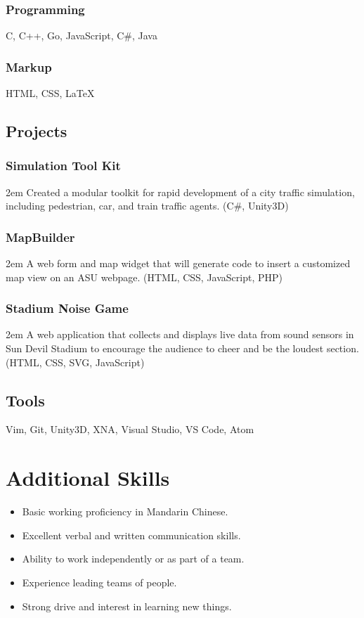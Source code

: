 \documentclass[letterpaper, 10pt]{article}
\begin{document}
\subsubsection{Programming}

C, C++, Go, JavaScript, C\#, Java

\subsubsection{Markup}

HTML, CSS, {\LaTeX}

\subsection{Projects}

\subsubsection{Simulation Tool Kit}
\hangindent2em Created a modular toolkit for rapid development of a city traffic simulation, including pedestrian, car, and train traffic agents. (C\#, Unity3D)

\subsubsection{MapBuilder}
\hangindent2em A web form and map widget that will generate code to insert a customized map view on an ASU webpage. (HTML, CSS, JavaScript, PHP)

\subsubsection{Stadium Noise Game}
\hangindent2em A web application that collects and displays live data from sound sensors in Sun Devil Stadium to encourage the audience to cheer and be the loudest section. (HTML, CSS, SVG, JavaScript)

\subsection{Tools}

Vim, Git, Unity3D, XNA, Visual Studio, VS Code, Atom

\section{Additional Skills}

\begin{itemize}	
\setlength\itemsep{-0.25em}
\item Basic working proficiency in Mandarin Chinese.
\item Excellent verbal and written communication skills.
\item Ability to work independently or as part of a team.
\item Experience leading teams of people.
\item Strong drive and interest in learning new things.
\end{itemize}
\end{document}
